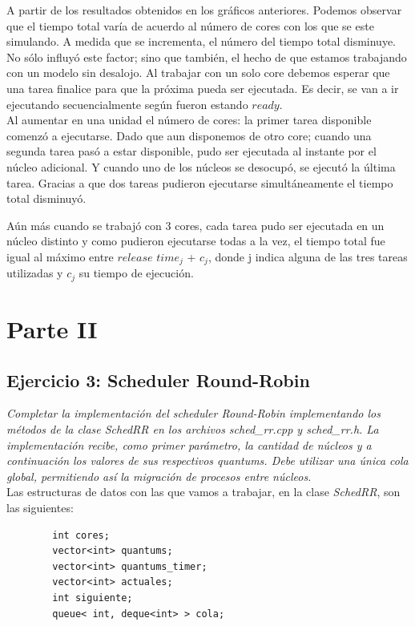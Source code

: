 \documentclass[a4paper]{article}
\begin{document}
A partir de los resultados obtenidos en los gráficos anteriores. Podemos observar que el tiempo total varía de acuerdo al número de cores con los que se este simulando. A medida que se incrementa, el número del tiempo total disminuye. No s\'olo influyó este factor; sino que también, el hecho de que estamos trabajando con un modelo sin desalojo.  
Al trabajar con un solo core debemos esperar que una tarea finalice para que la próxima pueda ser ejecutada. Es decir, se van a ir ejecutando secuencialmente según fueron estando $ready$. \\

Al aumentar en una unidad el número de cores: la primer tarea disponible comenzó a ejecutarse. Dado que aun disponemos de otro core; cuando una segunda tarea pas\'o a estar disponible, pudo ser ejecutada al instante por el núcleo adicional. Y cuando uno de los n\'ucleos se desocupó, se ejecutó la última tarea. Gracias a que dos tareas pudieron ejecutarse simult\'aneamente el tiempo total disminuyó. 

Aún más cuando se trabajó con 3 cores, cada tarea pudo ser ejecutada en un núcleo distinto y como pudieron ejecutarse todas a la vez, el tiempo total fue igual al máximo entre $release$ $time_j$ + $c_j$, donde j indica alguna de las tres tareas utilizadas y $c_j$ su tiempo de ejecución.   

\newpage

\section{Parte II}


\subsection{Ejercicio 3: Scheduler Round-Robin}\label{RoundR}

\textit{Completar la implementaci\'on del scheduler Round-Robin implementando los m\'etodos de la clase SchedRR en los archivos sched_rr.cpp y sched_rr.h. La implementaci\'on recibe, como primer par\'ametro, la cantidad de n\'ucleos y a continuaci\'on los valores de sus respectivos quantums. Debe utilizar una \'unica cola global, permitiendo as\'i la migraci\'on de procesos entre n\'ucleos.}\\


Las estructuras de datos con las que vamos a trabajar, en la clase \emph{SchedRR}, son las siguientes:
	\begin{codesnippet}
	\begin{verbatim}
		int cores;
		vector<int> quantums;
		vector<int> quantums_timer;
		vector<int> actuales;
		int siguiente;
		queue< int, deque<int> > cola;
	\end{verbatim}
	\end{codesnippet}
	
\end{document}
